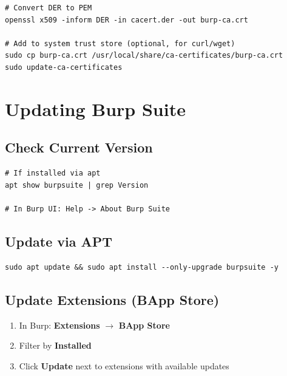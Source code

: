 \begin{lstlisting}[style=terminal, caption={Alternatively import certificate via command line}]
# Convert DER to PEM
openssl x509 -inform DER -in cacert.der -out burp-ca.crt

# Add to system trust store (optional, for curl/wget)
sudo cp burp-ca.crt /usr/local/share/ca-certificates/burp-ca.crt
sudo update-ca-certificates
\end{lstlisting}


\section{Updating Burp Suite}

\subsection{Check Current Version}

\begin{lstlisting}[style=terminal, caption={Check Burp Suite version}]
# If installed via apt
apt show burpsuite | grep Version

# In Burp UI: Help -> About Burp Suite
\end{lstlisting}

\subsection{Update via APT}

\begin{lstlisting}[style=terminal, caption={Update Burp Suite}]
sudo apt update && sudo apt install --only-upgrade burpsuite -y
\end{lstlisting}

\subsection{Update Extensions (BApp Store)}

\begin{enumerate}
  \item In Burp: \textbf{Extensions} $\to$ \textbf{BApp Store}
  \item Filter by \textbf{Installed}
  \item Click \textbf{Update} next to extensions with available updates
\end{enumerate}

